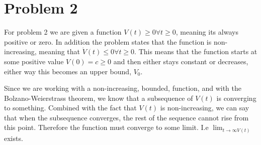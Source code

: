 \section{Problem 2}

For problem 2 we are given a function $V(t)\geq 0 \forall t \geq 0 $, meaning its always positive or zero. 
In addition the problem states that the function is non-increasing, meaning that $\dot{V}(t) \leq 0 \forall t \geq 0$. 
This means that the function starts at some positive value $V(0) = c \geq 0$ and then either stays constant or decreases, either way this becomes an upper bound, $V_0$.

Since we are working with a non-increasing, bounded, function, and with the Bolzano-Weierstrass theorem, we know that a subsequence of $V(t)$ is converging to something.
Combined with the fact that $V(t)$ is non-increasing, we can say that when the subsequence converges, the rest of the sequence cannot rise from this point. 
Therefore the function must converge to some limit. I.e $\lim_{t\rightarrow \infty V(t)}$ exists.
